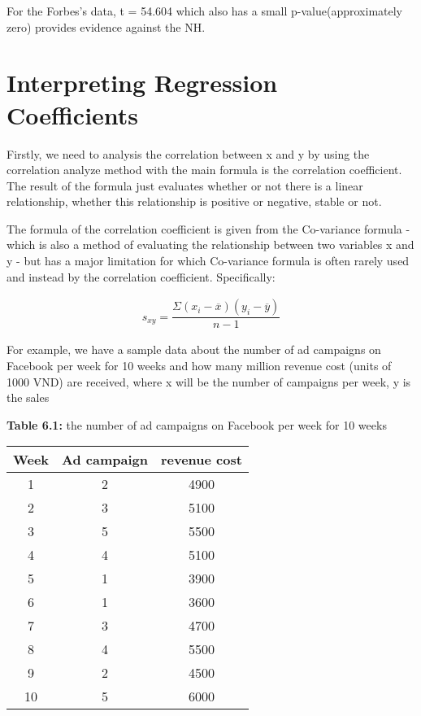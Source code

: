 \documentclass{article}
\begin{document}
     For the Forbes's data, t = 54.604 which also has a small p-value(approximately zero) provides evidence against the NH. 
     
     
\section {Interpreting Regression Coefficients} 
    Firstly, we need to analysis the correlation between x and y by using the correlation analyze method with the main formula is the correlation coefficient. The result of the formula just evaluates whether or not there is a linear relationship, whether this relationship is positive or negative, stable or not.  
    
    The formula of the correlation coefficient is given from the Co-variance formula - which is also a method of evaluating the relationship between two variables x and y - but has a major limitation for which Co-variance formula is often rarely used and instead by the correlation coefficient. Specifically:
    
    \begin{align} 
        s_{xy} = \dfrac{\Sigma{(x_{i} - \overline{x})(y_{i} - \overline{y})}}{n - 1}\nonumber
    \end{align}
    
    For example, we have a sample data about the number of ad campaigns on Facebook per week for 10 weeks and how many million revenue cost (units of 1000 VND) are received, where x will be the number of campaigns per week, y is the sales


    \begin{center}
        \textbf{Table 6.1:} the number of ad campaigns on Facebook per week for 10 weeks
        
        \begin{tabular}{|c|c|c|}
            \hline 
            Week & Ad campaign & revenue cost  \\
            \hline
                1 & 2 & 4900 \\
                2 & 3 & 5100 \\ 
                3 & 5 & 5500 \\
                4 & 4 & 5100 \\
                5 & 1 & 3900 \\
                6 & 1 & 3600 \\
                7 & 3 & 4700 \\
                8 & 4 & 5500 \\
                9 & 2 & 4500 \\ 
                10 & 5 & 6000 \\
            \hline
        \end{tabular}
    \end{center}
    
\end{document}
